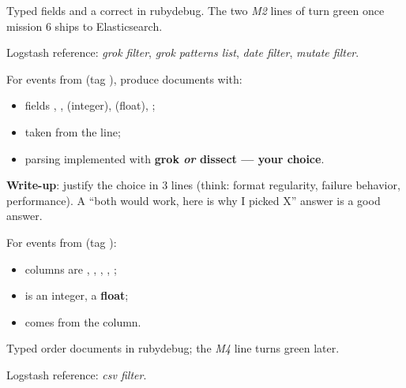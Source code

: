 \documentclass[11pt,a4paper]{article}
\begin{document}
\begin{whybox}
Typed fields and a correct  in rubydebug. The two \emph{M2}
lines of  turn green once mission 6 ships to Elasticsearch.
\end{whybox}

\begin{docbox}
Logstash reference: \emph{grok filter}, \emph{grok patterns list},
\emph{date filter}, \emph{mutate filter}.
\end{docbox}


For events from  (tag ), produce documents with:
\begin{itemize}
  \item fields , ,  (integer),
         (float), ;
  \item {} taken from the line;
  \item parsing implemented with \textbf{grok \emph{or} dissect — your choice}.
\end{itemize}

\textbf{Write-up}: justify the choice in 3 lines (think: format regularity,
failure behavior, performance). A ``both would work, here is why I picked X''
answer is a good answer.


For events from  (tag ):
\begin{itemize}
  \item columns are , , ,
        , ;
  \item {} is an integer,  a \textbf{float};
  \item {} comes from the  column.
\end{itemize}

\begin{whybox}
Typed order documents in rubydebug; the \emph{M4} line turns green later.
\end{whybox}

\begin{docbox}
Logstash reference: \emph{csv filter}.
\end{docbox}

\end{document}
